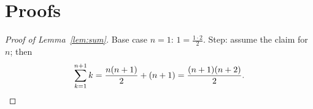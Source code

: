 \chapter{Proofs}\label{app:proofs}

\begin{proof}[Proof of Lemma~\ref{lem:sum}]
Base case $n=1$: $1 = \frac{1\cdot 2}{2}$. Step: assume the claim for $n$; then
\[
  \sum_{k=1}^{n+1} k = \frac{n(n+1)}{2} + (n+1) = \frac{(n+1)(n+2)}{2}. \qedhere
\]
\end{proof}
